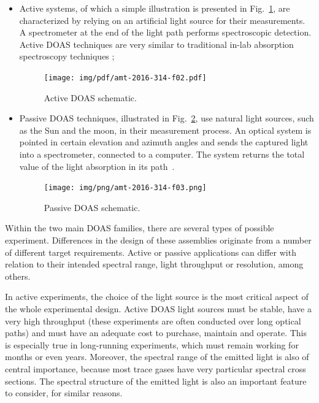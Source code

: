 \begin{itemize}

        \item Active systems, of which a simple illustration is
            presented in Fig.~\ref{fig:activeSmall}, are characterized
            by relying on an artificial light source for their
            measurements. A spectrometer at the end of the light path
            performs spectroscopic detection. Active DOAS techniques are
            very similar to traditional in-lab absorption spectroscopy
            techniques \cite{Platt2007};

            \begin{figure}[htb]
                \centering
                \texttt{[image: img/pdf/amt-2016-314-f02.pdf]}
                \caption{Active DOAS schematic.}\label{fig:activeSmall}
              \end{figure}

        \item Passive DOAS techniques, illustrated in
            Fig.~\ref{fig:passiveSchematic}, use natural light sources,
            such as the Sun and the moon, in their measurement process.
            An optical system is pointed in certain elevation and
            azimuth angles and sends the captured light into a
            spectrometer, connected to a computer. The system returns
            the total value of the light absorption in its
            path~\cite{Platt2007,Merlaud2013}.

              \begin{figure}[htb]
                  \centering
                  \texttt{[image: img/png/amt-2016-314-f03.png]}
                  \caption{Passive DOAS schematic.}\label{fig:passiveSchematic}
              \end{figure}
\end{itemize}

Within the two main \gls{DOAS} families, there are several types of
possible experiment. Differences in the design of these assemblies
originate from a number of different target requirements. Active or
passive applications can differ with relation to their intended spectral
range, light throughput or resolution, among others.

In active experiments, the choice of the light source is the most
critical aspect of the whole experimental design. Active \gls{DOAS}
light sources must be stable, have a very high throughput (these
experiments are often conducted over long optical paths) and must have
an adequate cost to purchase, maintain and operate. This is especially
true in long-running experiments, which must remain working for months
or even years. Moreover, the spectral range of the emitted light is also
of central importance, because most trace gases have very particular
spectral cross sections. The spectral structure of the emitted light is
also an important feature to consider, for similar reasons.

